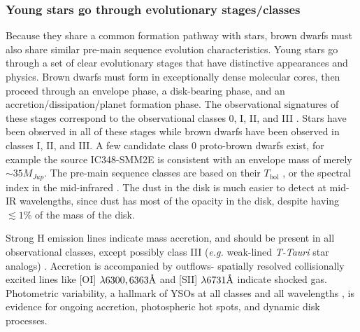 \subsubsection{Young stars go through evolutionary stages/classes}
Because they share a common formation pathway with stars, brown dwarfs must also share similar pre-main sequence evolution characteristics.  Young stars go through a set of clear evolutionary stages that have distinctive appearances and physics.  Brown dwarfs must form in exceptionally dense molecular cores, then proceed through an envelope phase, a disk-bearing phase, and an accretion/dissipation/planet formation phase.  The observational signatures of these stages correspond to the observational classes 0, I, II, and III \citep{1987ApJ...312..788A}.  Stars have been observed in all of these stages \citep{2014prpl.conf..195D} while brown dwarfs have been observed in classes I, II, and III.  A few candidate class 0 proto-brown dwarfs exist\citep{2012Sci...337...69A,2014A&A...564A..32P,2014MNRAS.444..833P}, for example the source IC348-SMM2E is consistent with an envelope mass of merely $\sim35 M_{Jup}$.  The pre-main sequence classes are based on their $T_{\mathrm{bol}}$ \citep{1993ApJ...413L..47M}, or the spectral index in the mid-infrared \citep{1984ApJ...287..610L}.  The dust in the disk is much easier to detect at mid-IR wavelengths, since dust has most of the opacity in the disk, despite having $\lesssim1\%$ of the mass of the disk.  

Strong H emission lines indicate mass accretion, and should be present in all observational classes, except possibly class III (\emph{e.g.} weak-lined \emph{T-Tauri} star analogs) \citep{2009apsf.book.....H}.  Accretion is accompanied by outflows- spatially resolved collisionally excited lines like [OI] $\lambda 6300, 6363 \mbox{\normalfont\AA}$ and [SII] $\lambda 6731 \mbox{\normalfont\AA}$ \citep{2005Natur.435..652W} indicate shocked gas.  Photometric variability, a hallmark of YSOs at all classes and all wavelengths \citep{2014AJ....148...92R,2014AJ....147...82C}, is evidence for ongoing accretion, photospheric hot spots, and dynamic disk processes.

